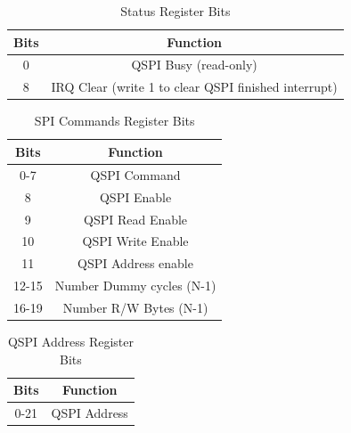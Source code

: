 \documentclass{report}
\begin{document}
\begin{table}[!h]
    \begin{center}
    \caption{Status Register Bits}
    \label{address-map}
    \begin{tabular}{||c | c ||}
        \hline
        Bits & Function \\
        \hline\hline
        0 & QSPI Busy (read-only) \\
        \hline
        8 & IRQ Clear (write 1 to clear QSPI finished interrupt) \\
        \hline
    \end{tabular}
\end{center}
\end{table}

\begin{table}[!h]
    \begin{center}
    \caption{SPI Commands Register Bits}
    \label{address-map}
    \begin{tabular}{||c | c ||}
        \hline
        Bits & Function \\ 
        \hline\hline
        0-7 & QSPI Command \\
        \hline 
        8 & QSPI Enable \\
        \hline
        9 & QSPI Read Enable \\
        \hline
        10 & QSPI Write Enable \\
        \hline 
        11 & QSPI Address enable \\
        \hline
        12-15 & Number Dummy cycles (N-1) \\
        \hline
        16-19 & Number R/W Bytes (N-1) \\
        \hline
    \end{tabular}
\end{center}
\end{table}

\begin{table}[!h]
    \begin{center}
    \caption{QSPI Address Register Bits}
    \label{address-map}
    \begin{tabular}{||c | c ||}
        \hline
        Bits & Function \\ 
        \hline\hline
        0-21 & QSPI Address \\
        \hline 
    \end{tabular}
\end{center}
\end{table}
\end{document}

